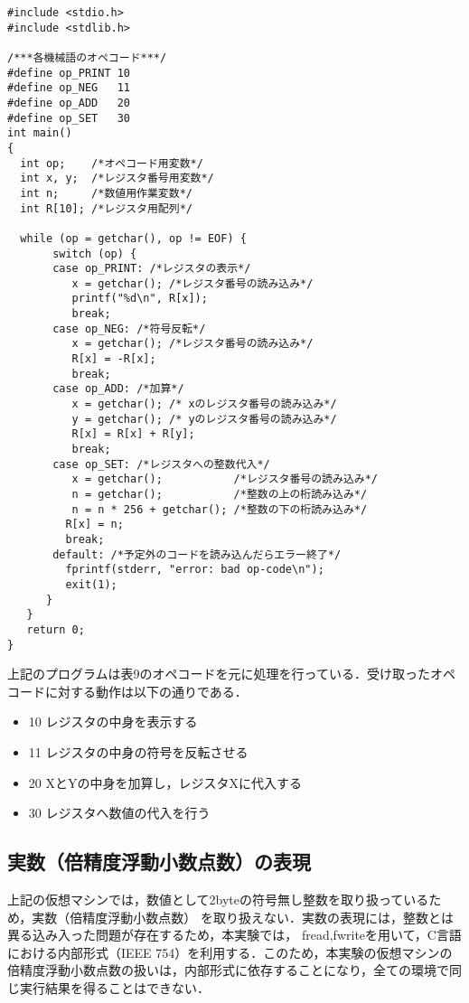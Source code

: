 \documentclass[a4j]{jsarticle}  %
\begin{document}
\begin{shadebox}[l]
\begin{verbatim}
#include <stdio.h>
#include <stdlib.h>

/***各機械語のオペコード***/
#define op_PRINT 10
#define op_NEG   11
#define op_ADD   20
#define op_SET   30
int main()
{
  int op;    /*オペコード用変数*/
  int x, y;  /*レジスタ番号用変数*/
  int n;     /*数値用作業変数*/
  int R[10]; /*レジスタ用配列*/

  while (op = getchar(), op != EOF) {
       switch (op) {
       case op_PRINT: /*レジスタの表示*/
          x = getchar(); /*レジスタ番号の読み込み*/
          printf("%d\n", R[x]);
          break; 
       case op_NEG: /*符号反転*/
          x = getchar(); /*レジスタ番号の読み込み*/
          R[x] = -R[x];
          break;
       case op_ADD: /*加算*/
          x = getchar(); /* xのレジスタ番号の読み込み*/
          y = getchar(); /* yのレジスタ番号の読み込み*/
          R[x] = R[x] + R[y];
          break;
       case op_SET: /*レジスタへの整数代入*/
          x = getchar();           /*レジスタ番号の読み込み*/
          n = getchar();           /*整数の上の桁読み込み*/
          n = n * 256 + getchar(); /*整数の下の桁読み込み*/
         R[x] = n;
         break;
       default: /*予定外のコードを読み込んだらエラー終了*/
         fprintf(stderr, "error: bad op-code\n");
         exit(1);
      }
   }
   return 0;
}
\end{verbatim}
\end{shadebox}

上記のプログラムは表9のオペコードを元に処理を行っている．受け取ったオペコードに対する動作は以下の通りである．

\begin{itemize}
\item 10  レジスタの中身を表示する
\item 11  レジスタの中身の符号を反転させる
\item 20  XとYの中身を加算し，レジスタXに代入する
\item 30  レジスタへ数値の代入を行う
\end{itemize}

\subsection{実数（倍精度浮動小数点数）の表現}
上記の仮想マシンでは，数値として2byteの符号無し整数を取り扱っているため，実数（倍精度浮動小数点数）
を取り扱えない．実数の表現には，整数とは異る込み入った問題が存在するため，本実験では，
fread,fwriteを用いて，C言語における内部形式（IEEE 754）を利用する．このため，本実験の仮想マシンの倍精度浮動小数点数の扱いは，内部形式に依存することになり，全ての環境で同じ実行結果を得ることはできない．
\end{document}
